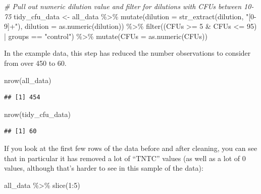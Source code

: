 \documentclass[
]{book}
\newenvironment{Shaded}{\begin{snugshade}}{\end{snugshade}}
\newcommand{\AttributeTok}[1]{\textcolor[rgb]{0.77,0.63,0.00}{#1}}
\newcommand{\CommentTok}[1]{\textcolor[rgb]{0.56,0.35,0.01}{\textit{#1}}}
\newcommand{\DecValTok}[1]{\textcolor[rgb]{0.00,0.00,0.81}{#1}}
\newcommand{\FunctionTok}[1]{\textcolor[rgb]{0.00,0.00,0.00}{#1}}
\newcommand{\NormalTok}[1]{#1}
\newcommand{\OtherTok}[1]{\textcolor[rgb]{0.56,0.35,0.01}{#1}}
\newcommand{\SpecialCharTok}[1]{\textcolor[rgb]{0.00,0.00,0.00}{#1}}
\newcommand{\StringTok}[1]{\textcolor[rgb]{0.31,0.60,0.02}{#1}}
\begin{document}
\begin{Shaded}
\begin{Highlighting}[]
\CommentTok{\# Pull out numeric dilution value and filter for dilutions with CFUs between 10{-}75}
\NormalTok{tidy\_cfu\_data }\OtherTok{\textless{}{-}}\NormalTok{ all\_data }\SpecialCharTok{\%\textgreater{}\%}
  \FunctionTok{mutate}\NormalTok{(}\AttributeTok{dilution =} \FunctionTok{str\_extract}\NormalTok{(dilution, }\StringTok{"[0{-}9]+"}\NormalTok{),}
         \AttributeTok{dilution =} \FunctionTok{as.numeric}\NormalTok{(dilution)) }\SpecialCharTok{\%\textgreater{}\%}
  \FunctionTok{filter}\NormalTok{((CFUs }\SpecialCharTok{\textgreater{}=} \DecValTok{5} \SpecialCharTok{\&}\NormalTok{ CFUs }\SpecialCharTok{\textless{}=} \DecValTok{95}\NormalTok{) }\SpecialCharTok{|}\NormalTok{ groups }\SpecialCharTok{==} \StringTok{"control"}\NormalTok{) }\SpecialCharTok{\%\textgreater{}\%}
  \FunctionTok{mutate}\NormalTok{(}\AttributeTok{CFUs =} \FunctionTok{as.numeric}\NormalTok{(CFUs)) }
\end{Highlighting}
\end{Shaded}

In the example data, this step has reduced the number observations to consider
from over 450 to 60.

\begin{Shaded}
\begin{Highlighting}[]
\FunctionTok{nrow}\NormalTok{(all\_data)}
\end{Highlighting}
\end{Shaded}

\begin{verbatim}
## [1] 454
\end{verbatim}

\begin{Shaded}
\begin{Highlighting}[]
\FunctionTok{nrow}\NormalTok{(tidy\_cfu\_data)}
\end{Highlighting}
\end{Shaded}

\begin{verbatim}
## [1] 60
\end{verbatim}

If you look at the first few rows of the data before and after cleaning, you can
see that in particular it has removed a lot of ``TNTC'' values (as well as a lot
of 0 values, although that's harder to see in this sample of the data):

\begin{Shaded}
\begin{Highlighting}[]
\NormalTok{all\_data }\SpecialCharTok{\%\textgreater{}\%} 
  \FunctionTok{slice}\NormalTok{(}\DecValTok{1}\SpecialCharTok{:}\DecValTok{5}\NormalTok{)}
\end{Highlighting}
\end{Shaded}
\end{document}

